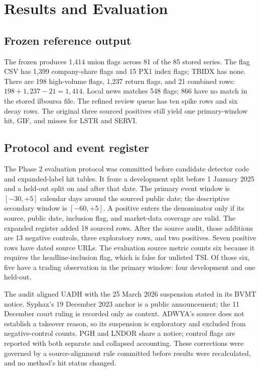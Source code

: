 \chapter{Results and Evaluation}

\section{Frozen reference output}
The frozen  produces 1,414 union flags across 81 of the
85 stored series. The flag CSV has 1,399 company-share flags and
15 PX1 index flags; TBIDX has none. There are 198 high-volume flags, 1,237 return flags,
and 21 combined rows: $198+1,237-21=1,414$. Local news matches 548 flags;
866 have no match in the stored ilboursa file. The refined review queue has
ten spike rows and six decay rows. The original three sourced positives
still yield one primary-window hit, GIF, and misses for LSTR and SERVI.

\section{Protocol and event register}
The Phase 2 evaluation protocol was committed before candidate detector code
and expanded-label hit tables. It froze a development split before
1 January 2025 and a held-out split on and after that date. The primary
event window is $[-30,+5]$ calendar days around the sourced public date;
the descriptive secondary window is $[-60,+5]$. A positive enters the
denominator only if its source, public date, inclusion flag, and market-data
coverage are valid. The expanded register added 18 sourced rows. After the
source audit, those additions are 13 negative controls, three exploratory
rows, and two positives. Seven positive rows have dated source URLs. The evaluation source
metric counts six because it requires the headline-inclusion flag, which
is false for unlisted TSI. Of those six, five have a trading observation
in the primary window: four development and one held-out.

The audit aligned UADH with the 25 March 2026 suspension stated in its BVMT
notice. Syphax's 19 December 2023 anchor is a public announcement; the
11 December court ruling is recorded only as context. ADWYA's source does
not establish a takeover reason, so its suspension is exploratory and
excluded from negative-control counts. PGH and LNDOR share a notice;
control flags are reported with both separate and collapsed accounting.
These corrections were governed by a source-alignment rule committed before
results were recalculated, and no method's hit status changed.

